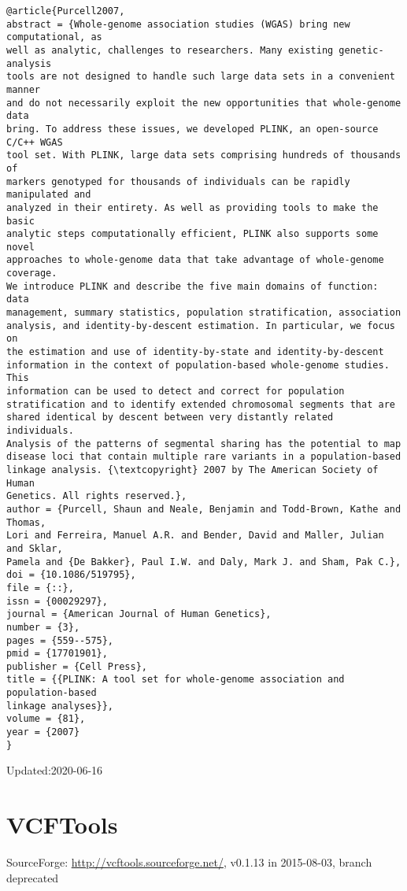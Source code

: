 \documentclass[]{article}
\begin{document}
\begin{verbatim}
@article{Purcell2007,
abstract = {Whole-genome association studies (WGAS) bring new computational, as
well as analytic, challenges to researchers. Many existing genetic-analysis
tools are not designed to handle such large data sets in a convenient manner
and do not necessarily exploit the new opportunities that whole-genome data
bring. To address these issues, we developed PLINK, an open-source C/C++ WGAS
tool set. With PLINK, large data sets comprising hundreds of thousands of
markers genotyped for thousands of individuals can be rapidly manipulated and
analyzed in their entirety. As well as providing tools to make the basic
analytic steps computationally efficient, PLINK also supports some novel
approaches to whole-genome data that take advantage of whole-genome coverage.
We introduce PLINK and describe the five main domains of function: data
management, summary statistics, population stratification, association
analysis, and identity-by-descent estimation. In particular, we focus on
the estimation and use of identity-by-state and identity-by-descent
information in the context of population-based whole-genome studies. This
information can be used to detect and correct for population
stratification and to identify extended chromosomal segments that are
shared identical by descent between very distantly related individuals.
Analysis of the patterns of segmental sharing has the potential to map
disease loci that contain multiple rare variants in a population-based
linkage analysis. {\textcopyright} 2007 by The American Society of Human
Genetics. All rights reserved.},
author = {Purcell, Shaun and Neale, Benjamin and Todd-Brown, Kathe and Thomas,
Lori and Ferreira, Manuel A.R. and Bender, David and Maller, Julian and Sklar,
Pamela and {De Bakker}, Paul I.W. and Daly, Mark J. and Sham, Pak C.},
doi = {10.1086/519795},
file = {::},
issn = {00029297},
journal = {American Journal of Human Genetics},
number = {3},
pages = {559--575},
pmid = {17701901},
publisher = {Cell Press},
title = {{PLINK: A tool set for whole-genome association and population-based
linkage analyses}},
volume = {81},
year = {2007}
}
\end{verbatim}

Updated:2020-06-16

\section{VCFTools}

SourceForge: \url{http://vcftools.sourceforge.net/}, v0.1.13 in 2015-08-03, branch deprecated
\end{document}
